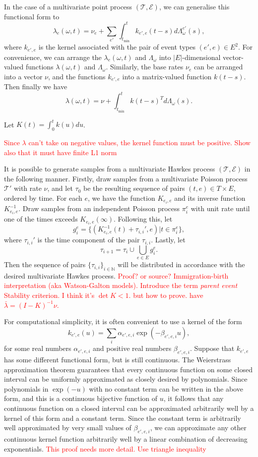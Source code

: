 \documentclass[honours,12pt]{unswthesis}
\numberwithin{equation}{section}
\begin{document}
In the case of a multivariate point process $(\mathcal{T},\mathcal{E})$, we can generalise this functional form to
$$\lambda_e(\omega,t) = \nu_e + \sum_{e'} \int_{t_\mathrm{min}}^t k_{e',e}(t-s)d\Lambda_\omega^{e'}(s),$$
where $k_{e',e}$ is the kernel associated with the pair of event types $(e',e)\in E^2$. For convenience, we can arrange the $\lambda_e(\omega,t)$ and $\Lambda_\omega$ into $\vert E\vert$-dimensional vector-valued functions $\lambda(\omega,t)$ and $\Lambda_\omega$. Similarly, the base rates $\nu_e$ can be arranged into a vector $\nu$, and the functions $k_{e',e}$ into a matrix-valued function $k(t-s)$. Then finally we have
$$\lambda(\omega,t) = \nu + \int_{t_\mathrm{min}}^t k(t-s)^T d\Lambda_\omega(s).$$

Let $K(t)=\int_0^t k(u)du$.

\textcolor{red}{Since $\lambda$ can't take on negative values, the kernel function must be positive. Show also that it must have finite L1 norm}

It is possible to generate samples from a multivariate Hawkes process $(\mathcal{T},\mathcal{E})$ in the following manner. Firstly, draw samples from a multivariate Poisson process $\mathcal{T}'$ with rate $\nu$, and let $\tau_0$ be the resulting sequence of pairs $(t,e)\in T\times E$, ordered by time. For each $e$, we have the function $K_{e_i,e}$ and its inverse function $K_{e_i,e}^{-1}$. Draw samples from an independent Poisson process $\pi_i^e$ with unit rate until one of the times exceeds $K_{e_i,e}(\infty)$. Following this, let $$g_i^e=\{(K_{e_i,e}^{-1}(t)+\tau_{i,i}',e) \vert t\in\pi_i^e\},$$ where $\tau_{i,i}'$ is the time component of the pair $\tau_{i,i}$. Lastly, let $$\tau_{i+1}=\tau_i\cup \bigcup_{e\in E}g_i^e.$$ Then the sequence of pairs $\{\tau_{i,i}\}_{i\in\mathbb{N}}$ will be distributed in accordance with the desired multivariate Hawkes process. \textcolor{red}{Proof? or source? Immigration-birth interpretation \cite{MorariuPatrichiPakkanen} (aka Watson-Galton models). Introduce the term \textit{parent event}}
\textcolor{red}{Stability criterion. I think it's $\det K<1$. but how to prove. have $\bar\lambda = (I-K)^{-1}\nu$.}

For computational simplicity, it is often convenient to use a kernel of the form
$$k_{e',e}(u) = \sum_i \alpha_{e',e,i}\exp(-\beta_{e',e,i} u),$$
for some real numbers $\alpha_{e',e,i}$ and positive real numbers $\beta_{e',e,i}$.
Suppose that $k_{e',e}$ has some different functional form, but is still continuous. The Weierstrass approximation theorem guarantees that every continuous function on some closed interval can be uniformly approximated as closely desired by polynomials. Since polynomials in $\exp(-u)$ with no constant term can be written in the above form, and this is a continuous bijective function of $u$, it follows that any continuous function on a closed interval can be approximated arbitrarily well by a kernel of this form and a constant term. Since the constant term is arbitrarily well approximated by very small values of $\beta_{e',e,i}$, we can approximate any other continuous kernel function arbitrarily well by a linear combination of decreasing exponentials.
\textcolor{red}{This proof needs more detail. Use triangle inequality}
\end{document}
